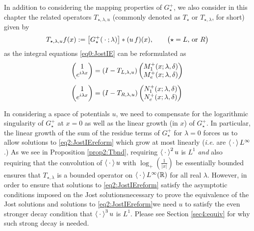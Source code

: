 \documentclass[../dissertation.tex]{subfiles}
\begin{document}
In addition to considering the mapping properties of $G_\star^+$, we also 
consider in this chapter the related operators $T_{\star, \lambda, u}$
(commonly denoted as $T_{\star}$ or $T_{\star, \lambda}$, for short) given by 
\begin{align}\label{eqn2:Tdefn}
	T_{\star, \lambda, u} f(x) 
		:= \big[ G_\star^+(\kern 0.5ex \cdot \kern 0.5ex; \lambda) \big] * (u\,f)(x),
			\qquad \big( \star = L \text{, or } R \big)
\end{align}
as the integral equations \eqref{eq0:JostIE} can be reformulated as
\begin{subequations}
	\label{eq2:JostIEreform}
	\begin{align}
		\label{eq2:JostIEleftReform}
		\begin{pmatrix}
			1 \\
			e^{i\lambda x} 
		\end{pmatrix}
			&= (I - T_{L, \lambda, u})
				\begin{pmatrix}
					M_1^+(x; \lambda, \delta) \\
					M_e^+(x; \lambda, \delta)
				\end{pmatrix} \\[0.3\baselineskip]
		\label{eq2:JostIErightReform}
		\begin{pmatrix}
			1 \\
			e^{i\lambda x} 
		\end{pmatrix}
			&= (I - T_{R, \lambda, u})
				\begin{pmatrix}
					N_1^+(x; \lambda, \delta) \\
					N_e^+(x; \lambda, \delta)
				\end{pmatrix} 
\end{align}
\end{subequations}

In considering a space of potentials $u$, we need to compensate 
for the logarithmic singularity of $G_\star^+$ at $x = 0$ as well as the linear
growth (in $x$) of $G_\star^+$. In particular, the linear growth of the sum of 
the residue terms of $G_\star^+$ for $\lambda = 0$ forces us to allow 
solutions to \eqref{eq2:JostIEreform} which grow at most linearly (\textit{i.e.}
are $\left\langle \kern 0.5ex \cdot \kern 0.5ex \right\rangle L^\infty$.) As we see in Proposition \ref{prop2:Tbnd}, requiring
$\left\langle \kern 0.5ex \cdot \kern 0.5ex \right\rangle^2 u$ is $L^1$ \textit{and} also requiring that the convolution
of $\left\langle \kern 0.5ex \cdot \kern 0.5ex \right\rangle u$ with $\log_+\left(\frac{1}{|x|}\right)$ be essentially bounded 
ensures that $T_{\star, \lambda}$ is a bounded operator on 
$\left\langle \kern 0.5ex \cdot \kern 0.5ex \right\rangle L^\infty(\mathbb R)$ for all real $\lambda$. However, in order
to ensure that solutions to \eqref{eq2:JostIEreform} satisfy the asymptotic 
conditions imposed on the Jost solutions\textemdash{}necessary to prove the 
equivalence of the Jost solutions and solutions to 
\eqref{eq2:JostIEreform}\textemdash{}we need $u$ to satisfy the even stronger
decay condition that $\left\langle \kern 0.5ex \cdot \kern 0.5ex \right\rangle^3 u$ is $L^1$. Please see Section 
\ref{sec4:equiv} for why such strong decay is needed.
\end{document}
